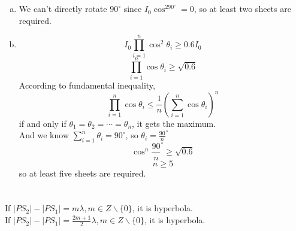 \documentclass{article}
\begin{document}
\section{}
\begin{enumerate}[(a)]
\item
We can't directly rotate $90^\circ$ since $I_0\cos^290^\circ=0$, so at least two sheets are required.
\item
$$I_0\prod_{i=1}^n\cos^2\theta_i\geqslant0.6I_0$$
$$\prod_{i=1}^n\cos\theta_i\geqslant\sqrt{0.6}$$
According to fundamental inequality,
$$\prod_{i=1}^n\cos\theta_i\leqslant\frac{1}{n}\left(\sum_{i=1}^n\cos\theta_i\right)^n$$
if and only if $\theta_1=\theta_2=\cdots=\theta_n$, it gets the maximum.\\
And we know $\sum_{i=1}^n\theta_i=90^\circ$, so $\theta_i=\frac{90}{n}^\circ$
$$\cos^n\frac{90}{n}^\circ\geqslant\sqrt{0.6}$$
$$n\geqslant5$$
so at least five sheets are required.

\end{enumerate}

\section{}
If $|PS_2|-|PS_1|=m\lambda,m\in Z\backslash\lbrace0\rbrace$, it is hyperbola.\\
If $|PS_2|-|PS_1|=\frac{2m+1}{2}\lambda,m\in Z\backslash\lbrace0\rbrace$, it is hyperbola.\\
\end{document}
